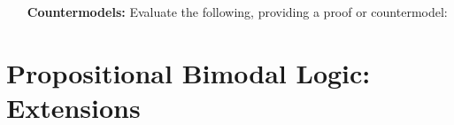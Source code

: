 \documentclass[a4paper, 11pt]{article} %
\begin{document}
\begin{enumerate}[leftmargin=1.2in]
  \item[\bf Countermodels:] Evaluate the following, providing a proof or countermodel:
    \begin{enumerate}[label=\arabic*.,resume]\small
    \end{enumerate}
\end{enumerate}




\section*{\sc Propositional Bimodal Logic: Extensions}
  
\end{document}
